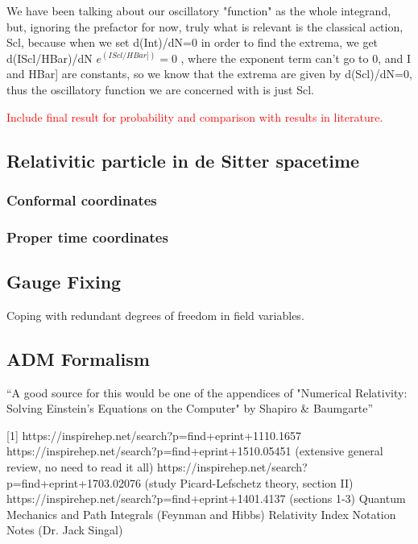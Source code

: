 \documentclass[12pt]{revtex4}
\newcommand{\red}{\textcolor{red}}
\begin{document}
We have been talking about our oscillatory "function" as the whole integrand, but, ignoring the prefactor for now, truly what is relevant is the classical action, Scl, because when we set d(Int)/dN=0 in order to find the extrema, we get d(IScl/HBar)/dN $e^(IScl/HBar])=0$ , where the exponent term can't go to 0, and I and HBar] are constants, so we know that the extrema are given by d(Scl)/dN=0, thus the oscillatory function we are concerned with is just Scl.

\red{Include final result for probability and comparison with results in literature.}


\subsection{Relativitic particle in de Sitter spacetime}

\subsubsection{Conformal coordinates}


\subsubsection{Proper time coordinates}

\subsection{Gauge Fixing} \label{gauge}
Coping with redundant degrees of freedom in field variables.

\subsection{ADM Formalism} \label{ADM}
``A good source for this would be one of the appendices of "Numerical Relativity: Solving Einstein's Equations on the Computer" by Shapiro \& Baumgarte''

\begin{thebibliography}{}

[1] https://inspirehep.net/search?p=find+eprint+1110.1657 \newline
[2] https://inspirehep.net/search?p=find+eprint+1510.05451  (extensive general review, no need to read it all) \newline
[3] https://inspirehep.net/search?p=find+eprint+1703.02076   (study Picard-Lefschetz theory, section II) \newline
[4] https://inspirehep.net/search?p=find+eprint+1401.4137   (sections 1-3) \newline
[5] Quantum Mechanics and Path Integrals (Feynman and Hibbs) \newline
[6] Relativity Index Notation Notes (Dr. Jack Singal) \newline
[7] \newline
[8] \newline
\end{thebibliography}
\end{document}

